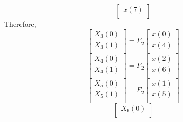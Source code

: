 \documentclass[journal,12pt,twocolumn]{IEEEtran}
\renewcommand\thesection{\arabic{section}}
\begin{document}
\begin{enumerate}[label=\arabic*.,ref=\thesection.\theenumi]
\begin{equation}
\begin{bmatrix}
                     x(7) \\
                \end{bmatrix}
           \end{equation}
           Therefore,
           \begin{equation}
                \begin{bmatrix}
                     X_{3}(0) \\
                     X_{3}(1) \\
                \end{bmatrix}
                = F_{2}
                \begin{bmatrix}
                     x(0) \\
                     x(4) \\
                \end{bmatrix}
           \end{equation}
           \begin{equation}
                \begin{bmatrix}
                     X_{4}(0) \\
                     X_{4}(1) \\
                \end{bmatrix}
                = F_{2}
                \begin{bmatrix}
                     x(2) \\
                     x(6) \\
                \end{bmatrix}
           \end{equation}
           \begin{equation}
                \begin{bmatrix}
                     X_{5}(0) \\
                     X_{5}(1) \\
                \end{bmatrix}
                = F_{2}
                \begin{bmatrix}
                     x(1) \\
                     x(5) \\
                \end{bmatrix}
           \end{equation}
           \begin{equation}
                \begin{bmatrix}
                     X_{6}(0) \\

\end{bmatrix}
\end{equation}
\end{enumerate}
\end{document}
